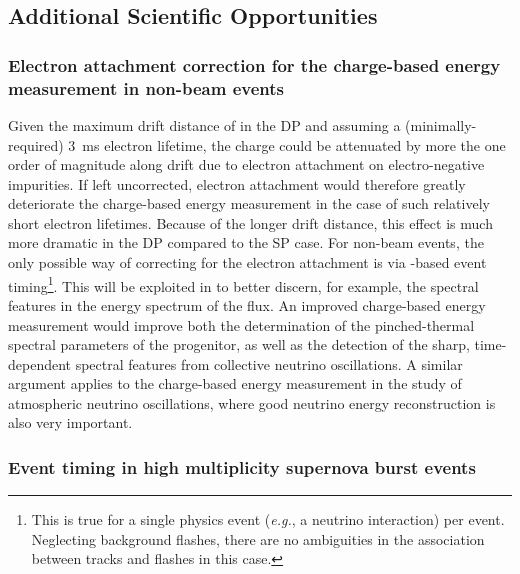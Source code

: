 
\subsection{Additional Scientific Opportunities}
\label{subsec:dp-pds-requirements_opportunities}

\subsubsection{Electron attachment correction for the charge-based energy measurement in non-beam events}
\label{subsubsec:dp-pds-requirements_attachment}

Given the maximum drift distance of \dpmaxdrift in the DP  and assuming a (minimally-required) \SI{3}{\ms} electron lifetime, the charge could be attenuated by more the one order of magnitude along drift due to electron attachment on electro-negative impurities. If left uncorrected, electron attachment would therefore greatly deteriorate the charge-based energy measurement in the case of such relatively short electron lifetimes. Because of the longer drift distance, this effect is much more dramatic in the DP compared to the SP case. For non-beam events, the only possible way of correcting for the electron attachment is via -based event timing\footnote{This is true for a single physics event (\emph{e.g.}, a neutrino interaction) per  event. Neglecting background flashes, there are no ambiguities in the association between  tracks and  flashes in this case.}. This will be exploited in  to better discern, for example, the spectral features in the energy spectrum of the  flux. An improved charge-based energy measurement would improve both the determination of the pinched-thermal spectral parameters of the progenitor, as well as the detection of the sharp, time-dependent spectral features from collective neutrino oscillations. A similar argument applies to the charge-based energy measurement in the study of atmospheric neutrino oscillations, where good neutrino energy reconstruction is also very important.

\subsubsection{Event timing in high multiplicity supernova burst events}

